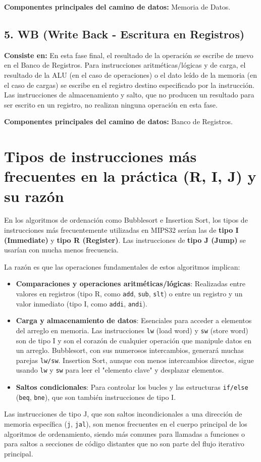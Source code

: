 \documentclass{article}
\begin{document}
\textbf{Componentes principales del camino de datos:} Memoria de Datos.

\subsection*{5. WB (Write Back - Escritura en Registros)}
\textbf{Consiste en:} En esta fase final, el resultado de la operación se escribe de nuevo en el Banco de Registros. Para instrucciones aritméticas/lógicas y de carga, el resultado de la ALU (en el caso de operaciones) o el dato leído de la memoria (en el caso de cargas) se escribe en el registro destino especificado por la instrucción. Las instrucciones de almacenamiento y salto, que no producen un resultado para ser escrito en un registro, no realizan ninguna operación en esta fase.

\textbf{Componentes principales del camino de datos:} Banco de Registros.

\section{Tipos de instrucciones más frecuentes en la práctica (R, I, J) y su razón}
En los algoritmos de ordenación como Bubblesort e Insertion Sort, los tipos de instrucciones más frecuentemente utilizadas en MIPS32 serían las de \textbf{tipo I (Immediate)} y \textbf{tipo R (Register)}. Las instrucciones de \textbf{tipo J (Jump)} se usarían con mucha menos frecuencia.

La razón es que las operaciones fundamentales de estos algoritmos implican:
\begin{itemize}
    \item \textbf{Comparaciones y operaciones aritméticas/lógicas}: Realizadas entre valores en registros (tipo R, como \texttt{add}, \texttt{sub}, \texttt{slt}) o entre un registro y un valor inmediato (tipo I, como \texttt{addi}, \texttt{andi}).
    \item \textbf{Carga y almacenamiento de datos}: Esenciales para acceder a elementos del arreglo en memoria. Las instrucciones \texttt{lw} (load word) y \texttt{sw} (store word) son de tipo I y son el corazón de cualquier operación que manipule datos en un arreglo. Bubblesort, con sus numerosos intercambios, generará muchas parejas \texttt{lw/sw}. Insertion Sort, aunque con menos intercambios directos, sigue usando \texttt{lw} y \texttt{sw} para leer el "elemento clave" y desplazar elementos.
    \item \textbf{Saltos condicionales}: Para controlar los bucles y las estructuras \texttt{if/else} (\texttt{beq}, \texttt{bne}), que son también instrucciones de tipo I.
\end{itemize}
Las instrucciones de tipo J, que son saltos incondicionales a una dirección de memoria específica (\texttt{j}, \texttt{jal}), son menos frecuentes en el cuerpo principal de los algoritmos de ordenamiento, siendo más comunes para llamadas a funciones o para saltos a secciones de código distantes que no son parte del flujo iterativo principal.
\end{document}
